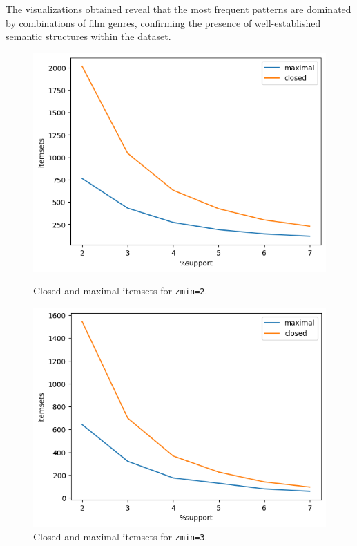 \documentclass{article}
\begin{document}
The visualizations obtained reveal that the most frequent patterns are dominated by combinations of film genres, confirming the presence of well-established semantic structures within the dataset.

\begin{figure}[H]
\centering
\begin{minipage}{0.48\textwidth}
  \includegraphics[width=\linewidth]{zmin2.png}
  \caption{Closed and maximal itemsets for \texttt{zmin=2}.}
  \label{fig:itemset_zmin2}
\end{minipage}
\hfill
\begin{minipage}{0.48\textwidth}
  \includegraphics[width=\linewidth]{zmin3.png}
  \caption{Closed and maximal itemsets for \texttt{zmin=3}.}
  \label{fig:itemset_zmin3}
\end{minipage}
\end{figure}
\end{document}
